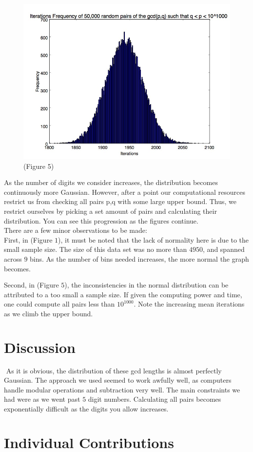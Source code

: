 \documentclass[11pt]{article}
\begin{document}
	\begin{figure}
		\centering

		\includegraphics[scale=.4]{1000_digit_numbers.jpg}
		\center \tiny(Figure 5)
		
	\end{figure}
	\newpage
	As the number of digits we consider increases, the distribution	 becomes continuously more Gaussian. However, after a point our computational resources restrict us from checking all pairs p,q with some large upper bound. Thus, we restrict ourselves by picking a set amount of pairs and calculating their distribution. You can see this progression as the figures continue.\\
	
	There are a few minor observations to be made:\\
	
	 First, in (Figure $1$), it must be noted that the lack of normality here is due to the small sample size. The size of this data set was no more than $4950$, and spanned across $9$ bins. As the number of bins needed increases, the more normal the graph becomes. 
	
	 Second, in (Figure $5$), the inconsistencies in the normal distribution can be attributed to a too small a sample size. If given the computing power and time, one could compute all pairs less than $10^{1000}$. Note the increasing mean iterations as we climb the upper bound.
\section{Discussion}$ $
As it is obvious, the distribution of these gcd lengths is almost perfectly Gaussian. The approach we used seemed to work awfully well, as computers handle modular operations and subtraction very well. The main constraints we had were as we went past $5$ digit numbers. Calculating all pairs becomes exponentially difficult as the digits you allow increases. 



\section{Individual Contributions}$ $
\end{document}
